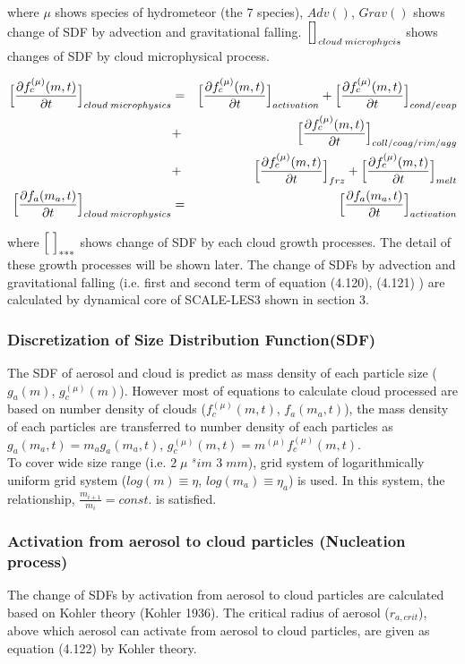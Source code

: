 where $\mu$ shows species of hydrometeor (the 7 species), $Adv()$, $Grav()$ shows change of SDF by advection and gravitational falling. $\Bigl[ \Bigr]_{cloud\;microphycis}$ shows changes of SDF by cloud microphysical process.

\begin{eqnarray}
\Bigl[ \frac{\partial f_{c}^{(\mu)}(m,t)}{\partial t}\Bigl]_{cloud\;microphysics}&=&\Bigl[\frac{\partial f_{c}^{(\mu)}(m,t)}{\partial t}\Bigr]_{activation}+\Bigl[\frac{\partial f_{c}^{(\mu)}(m,t)}{\partial t}\Bigr]_{cond/evap}\nonumber\\
&+&\Bigl[\frac{\partial f_{c}^{(\mu)}(m,t)}{\partial t}\Bigr]_{coll/coag/rim/agg}\nonumber\\
&+&\Bigl[\frac{\partial f_{c}^{(\mu)}(m,t)}{\partial t}\Bigr]_{frz}+\Bigl[\frac{\partial f_{c}^{(\mu)}(m,t)}{\partial t}\Bigr]_{melt}\nonumber\\
\Bigl[ \frac{\partial f_{a}(m_{a},t)}{\partial t}\Bigl]_{cloud\;microphysics}&=&\Bigl[\frac{\partial f_{a}(m_{a},t)}{\partial t}\Bigr]_{activation}\nonumber
\end{eqnarray}

where $\Bigl[\;\Bigr]_{***}$ shows change of SDF by each cloud growth processes. The detail of these growth processes will be shown later.
 The change of SDFs by advection and gravitational falling (i.e. first and second term of equation (4.120), (4.121) ) are calculated by dynamical core of SCALE-LES3 shown in section 3.


\subsubsection{Discretization of Size Distribution Function(SDF)}
The SDF of aerosol and cloud is predict as mass density of each particle size ($g_{a}(m)$, $g_{c}^{(\mu)}(m)$). However most of equations to calculate cloud processed are based on number density of clouds ($f_{c}^{(\mu)}(m,t)$, $f_{a}(m_{a},t)$), the mass density of each particles are transferred to number density of each particles as $g_{a}(m_{a},t)=m_{a}g_{a}(m_{a},t)$, $g_{c}^{(\mu)}(m,t)=m^{(\mu)}f_{c}^{(\mu)}(m,t)$.\\
To cover wide size range (i.e. $2\;\mu$ $^sim$ $3\;mm$), grid system of logarithmically uniform grid system ($log(m)\equiv \eta$, $log(m_{a})\equiv \eta_{a}$) is used. In this system, the relationship, $\frac{m_{i+1}}{m_{i}}=const.$ is satisfied. 

\subsubsection{Activation from aerosol to cloud particles (Nucleation process)}
The change of SDFs by activation from aerosol to cloud particles are calculated based on Kohler theory (Kohler 1936). The critical radius of aerosol ($r_{a,crit}$), above which aerosol can activate from aerosol to cloud particles, are given as equation (4.122) by Kohler theory.

